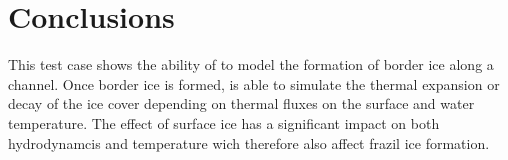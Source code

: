 \section{Conclusions}
This test case shows the ability of \khione to model the formation of border ice along a channel. Once border ice is formed, \khione is able to simulate the thermal expansion or decay of the ice cover depending on thermal fluxes on the surface and water temperature. The effect of surface ice has a significant impact on both hydrodynamcis and temperature wich therefore also affect frazil ice formation.

\renewcommand{\labelitemi}{\textbullet}
